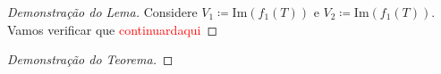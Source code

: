 \documentclass[11pt,twoside,a4paper]{book}
\begin{document}
\begin{proof}[Demonstração do Lema]
Considere \(V_1\coloneqq\text{Im}(f_1(T))\) e \(V_2\coloneqq\text{Im}(f_1(T))\). Vamos verificar que \textcolor{red}{continuardaqui}                                  \end{proof}
                                                                                                                                                                        \begin{proof}[Demonstração do Teorema]
                                                                                                                                                                         
                                                                                                                                                                        \end{proof}



                                                                                                                                                                        \printindex
\end{document}
